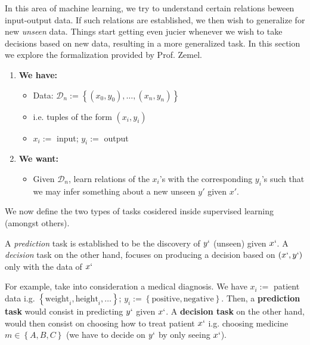 In this area of machine learning, we try to understand certain relations beween input-output data. If such relations are established, we then wish to generalize for new \textit{unseen} data.
Things start getting even jucier whenever we wish to take decisions based on new data, resulting in a more generalized task. In this section we explore the formalization provided by Prof. Zemel.

\begin{enumerate}
    \item \textbf{We have:}
    \begin{itemize}
        \item Data: $\mathcal{D}_n := \left\{ (x_0,y_0), \ldots, (x_n,y_n) \right\}$
        \item i.e. tuples of the form $(x_i, y_i)$
        \item $x_i:=$ input; $y_i:=$ output
    \end{itemize}

    \item \textbf{We want:}
    \begin{itemize}
        \item Given $\mathcal{D}_n$, learn relations of the $x_i$'s with the corresponding $y_i$'s such that we may infer something about a new unseen $y'$ given $x'$.
    \end{itemize}
\end{enumerate}

We now define the two types of tasks cosidered inside supervised learning (amongst others).

\begin{definition}
    A \textit{prediction} task is established to be the discovery of $y`$ (unseen) given $x`$. A \textit{decision} task on the
    other hand, focuses on producing a decision based on $(x`,y`)$ only with the data of $x`$
\end{definition}

For example, take into consideration a medical diagnosis. We have $x_i :=$ patient data i.g. $\left\{ \text{weight}_i, \text{height}_i, \ldots \right\}$; $y_i := \left\{ \text{positive}, \text{negative} \right\}$. Then, a \textbf{prediction task} 
would consist in predicting $y`$ given $x`$. A \textbf{decision task} on the other hand, would then consist on choosing how to treat patient $x`$ i.g. choosing medicine $m \in \left\{ A,B,C \right\}$ (we have to decide on $y`$ by only seeing $x`$).

\vspace{0.3cm}

